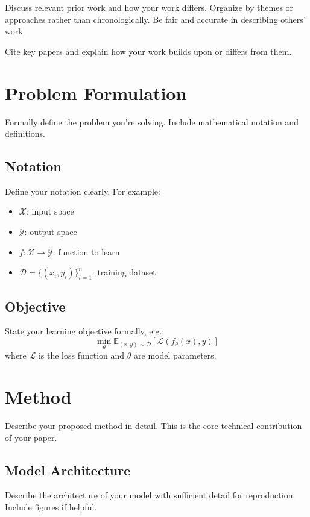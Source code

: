 \documentclass{article}
\begin{document}
Discuss relevant prior work and how your work differs. Organize by themes or approaches rather than chronologically. Be fair and accurate in describing others' work.

Cite key papers \cite{lecun2015deep, vaswani2017attention, devlin2019bert} and explain how your work builds upon or differs from them.

\section{Problem Formulation}
\label{sec:problem}

Formally define the problem you're solving. Include mathematical notation and definitions.

\subsection{Notation}
Define your notation clearly. For example:
\begin{itemize}
    \item $\mathcal{X}$: input space
    \item $\mathcal{Y}$: output space
    \item $f: \mathcal{X} \rightarrow \mathcal{Y}$: function to learn
    \item $\mathcal{D} = \{(x_i, y_i)\}_{i=1}^n$: training dataset
\end{itemize}

\subsection{Objective}
State your learning objective formally, e.g.:
\begin{equation}
\min_{\theta} \mathbb{E}_{(x,y) \sim \mathcal{D}} \left[ \mathcal{L}(f_\theta(x), y) \right]
\end{equation}
where $\mathcal{L}$ is the loss function and $\theta$ are model parameters.

\section{Method}
\label{sec:method}

Describe your proposed method in detail. This is the core technical contribution of your paper.

\subsection{Model Architecture}
Describe the architecture of your model with sufficient detail for reproduction. Include figures if helpful.
\end{document}
